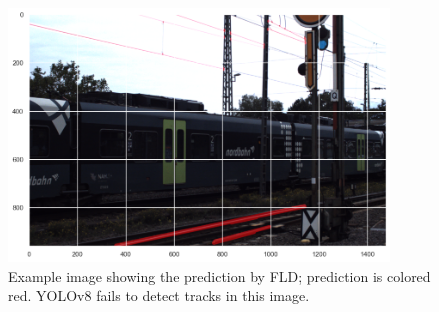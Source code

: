 \documentclass[Master,MDS,english]{BASE/twbook} %
\begin{document}
\begin{figure}[h]
\centering
\includegraphics[width=0.9\textwidth]{images/results/example1}
\caption{Example image showing the prediction by FLD; prediction is colored red. YOLOv8 fails to detect tracks in this image. }
\label{fig:res_example1}
\end{figure}
\end{document}
